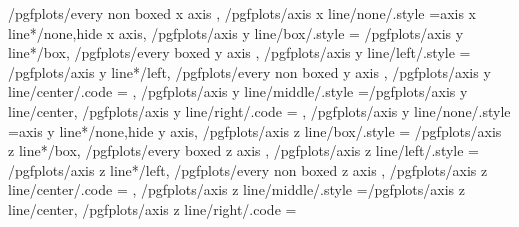 {{{{				/pgfplots/every non boxed x axis}%
		},
		/pgfplots/axis x line/none/.style	={axis x line*/none,hide x axis},
		/pgfplots/axis y line/box/.style	={
			/pgfplots/axis y line*/box,
			/pgfplots/every boxed y axis
		},
		/pgfplots/axis y line/left/.style	={
			/pgfplots/axis y line*/left,
			/pgfplots/every non boxed y axis
		},
		/pgfplots/axis y line/center/.code	={
			\ifnum{} %
			\else
			\fi
		},
		/pgfplots/axis y line/middle/.style	={/pgfplots/axis y line/center},
		/pgfplots/axis y line/right/.code	={%
			\ifnum{}
			\fi
		},%
		/pgfplots/axis y line/none/.style	={axis y line*/none,hide y axis},
		/pgfplots/axis z line/box/.style	={
			/pgfplots/axis z line*/box,
			/pgfplots/every boxed z axis
		},
		/pgfplots/axis z line/left/.style	={
			/pgfplots/axis z line*/left,
			/pgfplots/every non boxed z axis
		},
		/pgfplots/axis z line/center/.code	={
		},
		/pgfplots/axis z line/middle/.style	={/pgfplots/axis z line/center},
		/pgfplots/axis z line/right/.code	={%
			\ifnum{}
			\fi
			}}}
